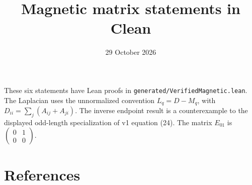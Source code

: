 \documentclass[11pt]{article}
\title{Magnetic matrix statements in Clean}
\author{}
\date{29 October 2026}
\begin{document}
\maketitle
{}\par\medskip
These six statements have Lean proofs in \texttt{generated/VerifiedMagnetic.lean}.
The Laplacian uses the unnormalized convention $L_q=D-M_q$, with
$D_{ii}=\sum_j(A_{ij}+A_{ji})$. The inverse endpoint result is a counterexample
to the displayed odd-length specialization of v1 equation (24).
The matrix $E_{01}$ is $\left(\begin{smallmatrix}0&1\\0&0\end{smallmatrix}\right)$.

\section*{References}

\end{document}
